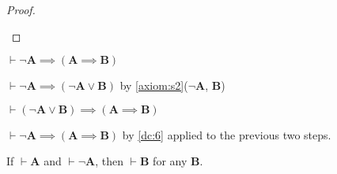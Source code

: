 \documentclass{amsart}%
\newcommand\metavariable[1]{\boldsymbol{#1}}
\begin{document}
\begin{proof}
\begin{enumerate}
\end{enumerate}
\end{proof}

\begin{lemma}\label{lemma:prop:explode-helper}
$\vdash\neg\metavariable{A}\implies(\metavariable{A}\implies\metavariable{B})$
\end{lemma}

\begin{pf}
\item $\vdash\neg\metavariable{A}\implies(\neg\metavariable{A}\lor\metavariable{B})$
  by \ref{axiom:s2}($\neg\metavariable{A}$, $\metavariable{B}$)
\item $\vdash(\neg\metavariable{A}\lor\metavariable{B})\implies(\metavariable{A}\implies\metavariable{B})$
\item $\vdash\neg\metavariable{A}\implies(\metavariable{A}\implies\metavariable{B})$
  by \ref{dc:6} applied to the previous two steps.
\end{pf}

\begin{lemma}\label{lemma:prop:explosion}
If $\vdash\metavariable{A}$ and $\vdash\neg\metavariable{A}$, then
$\vdash\metavariable{B}$ for any $\metavariable{B}$.
\end{lemma}
\end{document}
